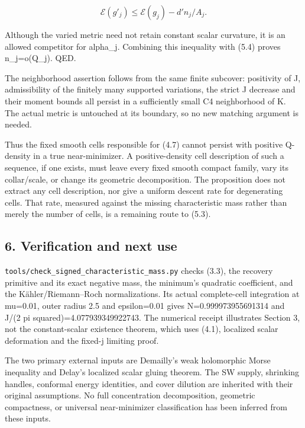 \documentclass[
  10pt,
]{article}
\begin{document}
\[
 \mathcal E(g'_j)\le\mathcal E(g_j)-d' n_j/A_j.
\]

Although the varied metric need not retain constant scalar curvature, it
is an allowed competitor for alpha\_j. Combining this inequality with
(5.4) proves n\_j=o(Q\_j). QED.

The neighborhood assertion follows from the same finite subcover:
positivity of J, admissibility of the finitely many supported
variations, the strict J decrease and their moment bounds all persist in
a sufficiently small C4 neighborhood of K. The actual metric is
untouched at its boundary, so no new matching argument is needed.

Thus the fixed smooth cells responsible for (4.7) cannot persist with
positive Q-density in a true near-minimizer. A positive-density cell
description of such a sequence, if one exists, must leave every fixed
smooth compact family, vary its collar/scale, or change its geometric
decomposition. The proposition does not extract any cell description,
nor give a uniform descent rate for degenerating cells. That rate,
measured against the missing characteristic mass rather than merely the
number of cells, is a remaining route to (5.3).

\hypertarget{verification-and-next-use}{%
\subsection{6. Verification and next
use}\label{verification-and-next-use}}

\texttt{tools/check\_signed\_characteristic\_mass.py} checks (3.3), the
recovery primitive and its exact negative mass, the minimum's quadratic
coefficient, and the Kähler/Riemann--Roch normalizations. Its actual
complete-cell integration at mu=0.01, outer radius 2.5 and epsilon=0.01
gives N=0.999973955691314 and J/(2 pi squared)=4.077939349922743. The
numerical receipt illustrates Section 3, not the constant-scalar
existence theorem, which uses (4.1), localized scalar deformation and
the fixed-j limiting proof.

The two primary external inputs are Demailly's weak holomorphic Morse
inequality and Delay's localized scalar gluing theorem. The SW supply,
shrinking handles, conformal energy identities, and cover dilution are
inherited with their original assumptions. No full concentration
decomposition, geometric compactness, or universal near-minimizer
classification has been inferred from these inputs.
\end{document}
